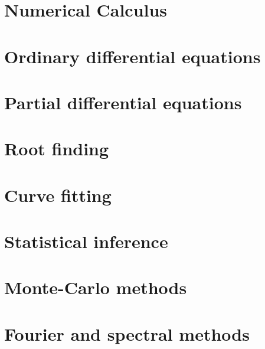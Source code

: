 \documentclass[prd,preprintnumbers,eqsecnum,floatfix,a4paper,nofootinbib]{revtex4}
\begin{document}


\section{Numerical Calculus}\label{sec:calc}



\section{Ordinary differential equations}


% 

\section{Partial differential equations}


% 
\section{Root finding}


\section{Curve fitting}
\label{sec:curve_fitting}


\section{Statistical inference}
\label{sec:statinf}

% 
\section{Monte-Carlo methods}


\section{Fourier and spectral methods}

 
% 
%


\end{document}
